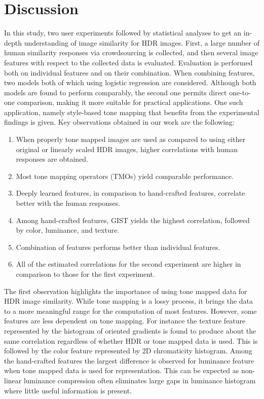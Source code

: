 \chapter{Discussion}
\label{chp:b6}

In this study, two user experiments followed by statistical
analyses to get an in-depth understanding of image similarity for HDR
images. First, a large number of human similarity responses via crowdsourcing is collected, and then several image features with respect to the collected data is evaluated. Evaluation is performed both on individual features and on their combination. When combining features, two models both of which using logistic regression are considered. Although both models are found to perform comparably, the second one permits direct one-to-one comparison, making it more suitable for practical applications. One such application, namely style-based tone mapping that benefits from the
experimental findings is given. Key observations obtained in our work are the following:
%
\begin{enumerate}
\item When properly tone mapped images are used as compared to using either original or linearly scaled HDR images, higher correlations with human responses are obtained.
\item Most tone mapping operators (TMOs) yield comparable performance.
\item Deeply learned features, in comparison to hand-crafted features, correlate better with the human responses.
\item Among hand-crafted features, GIST yields the highest correlation, followed by color, luminance, and texture.
\item Combination of features performs better than individual features.
\item All of the estimated correlations for the second experiment are higher in comparison to those for the first experiment.
\end{enumerate}

The first observation highlights the importance of using tone mapped data
for HDR image similarity. While tone mapping is a lossy process, it
brings the data to a more meaningful range for the computation of most
features. However, some features are less dependent on tone mapping. For
instance the texture feature represented by the histogram of oriented
gradients is found to produce about the same correlation regardless of
whether HDR or tone mapped data is used. This is followed by the color
feature represented by 2D chromaticity histogram. Among the hand-crafted
features the largest difference is  observed for luminance feature
when tone mapped data is used for representation. This can be expected as
non-linear luminance compression often eliminates large gaps in
luminance histogram where little useful information is present.

